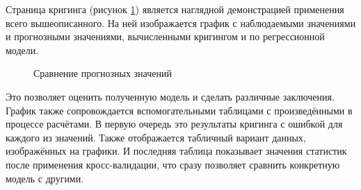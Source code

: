 Страница кригинга (рисунок \ref{img:mod_krige}) является наглядной демонстрацией применения всего вышеописанного. На ней изображается график с наблюдаемыми значениями и прогнозными значениями, вычисленными кригингом и по регрессионной модели.
\begin{figure}[ht]
\caption{Сравнение прогнозных значений}
\label{img:mod_krige}
\end{figure}
Это позволяет оценить полученную модель и сделать различные заключения. График также сопровождается вспомогательными таблицами с произведёнными в процессе расчётами. В первую очередь это результаты кригинга с ошибкой для каждого из значений. Также отображается табличный вариант данных, изображённых на графики. И последняя таблица показывает значения статистик после применения кросс-валидации, что сразу позволяет сравнить конкретную модель с другими.

